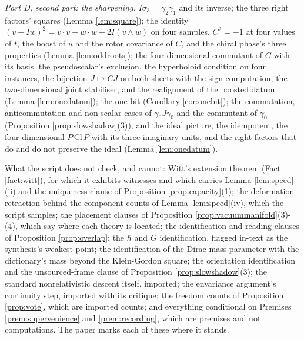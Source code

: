 \documentclass[11pt]{article}
\theoremstyle{definition}
\newcommand{\Cl}{\mathrm{Cl}}
\begin{document}
\emph{Part D, second part: the sharpening.} $I\sigma_{3} = \gamma_{2}\gamma_{1}$ and its inverse; the three right factors' squares (Lemma \ref{lem:square}); the identity $(v + Iw)^{2} = v\cdot v + w \cdot w - 2I(v \wedge w)$ on four samples, $C^{2} = -1$ at four values of $t$, the boost of $u$ and the rotor covariance of $C$, and the chiral phase's three properties (Lemma \ref{lem:oddroots}); the four-dimensional commutant of $C$ with its basis, the pseudoscalar's exclusion, the hyperboloid condition on four instances, the bijection $J \mapsto CJ$ on both sheets with the sign computation, the two-dimensional joint stabiliser, and the realignment of the boosted datum (Lemma \ref{lem:onedatum}); the one bit (Corollary \ref{cor:onebit}); the commutation, anticommutation and non-scalar cases of $\gamma_{0}J\gamma_{0}$ and the commutant of $\gamma_{0}$ (Proposition \ref{prop:slowshadow}(3)); and the ideal picture, the idempotent, the four-dimensional $P\,\Cl\,P$ with its three imaginary units, and the right factors that do and do not preserve the ideal (Lemma \ref{lem:onedatum}).

What the script does not check, and cannot: Witt's extension theorem (Fact \ref{fact:witt}), for which it exhibits witnesses and which carries Lemma \ref{lem:speed}(ii) and the uniqueness clause of Proposition \ref{prop:capacity}(1); the deformation retraction behind the component counts of Lemma \ref{lem:speed}(iv), which the script samples; the placement clauses of Proposition \ref{prop:vacuummanifold}(3)-(4), which say where each theory is located; the identification and reading clauses of Proposition \ref{prop:overlap}; the $\hbar$ and $G$ identification, flagged in-text as the synthesis's weakest point; the identification of the Dirac mass parameter with the dictionary's mass beyond the Klein-Gordon square; the orientation identification and the unsourced-frame clause of Proposition \ref{prop:slowshadow}(3); the standard nonrelativistic descent itself, imported; the envariance argument's continuity step, imported with its critique; the freedom counts of Proposition \ref{prop:vote}, which are imported counts; and everything conditional on Premises \ref{prem:supervenience} and \ref{prem:recording}, which are premises and not computations. The paper marks each of these where it stands.
\end{document}
